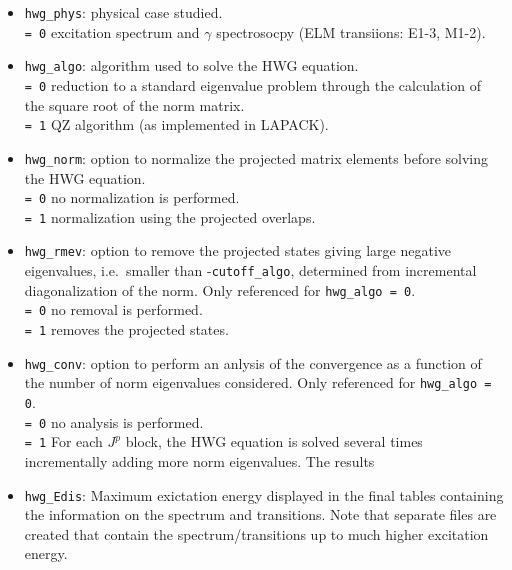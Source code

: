 \documentclass[a4paper,11pt]{article}
\newcommand{\ttt}[1]{\texttt{#1}}
\begin{document}
\begin{itemize}
\item \ttt{hwg\_phys}: physical case studied. \\[0.05cm]
 \ttt{= 0\:} excitation spectrum and $\gamma$ spectrosocpy (ELM transiions: E1-3, M1-2). 
\item \ttt{hwg\_algo}: algorithm used to solve the HWG equation. \\[0.05cm]
 \ttt{= 0\:} reduction to a standard eigenvalue problem through the calculation of the square root of the norm matrix. \\[0.05cm]
 \ttt{= 1\:} QZ algorithm (as implemented in LAPACK).
\item \ttt{hwg\_norm}: option to normalize the projected matrix elements before solving the HWG equation. \\[0.05cm]
 \ttt{= 0\:} no normalization is performed. \\[0.05cm]
 \ttt{= 1\:} normalization using the projected overlaps.
\item \ttt{hwg\_rmev}: option to remove the projected states giving large negative eigenvalues, i.e.\ smaller than -\ttt{cutoff\_algo}, determined from incremental
  diagonalization of the norm. Only referenced for \ttt{hwg\_algo = 0}. \\[0.05cm]
 \ttt{= 0\:} no removal is performed. \\[0.05cm]
 \ttt{= 1\:} removes the projected states.
\item \ttt{hwg\_conv}: option to perform an anlysis of the convergence as a function of the number of norm eigenvalues considered. Only referenced for \ttt{hwg\_algo = 0}. \\[0.05cm]
 \ttt{= 0\:} no analysis is performed. \\[0.05cm]
 \ttt{= 1\:} For each $J^p$ block, the HWG equation is solved several times incrementally adding more norm eigenvalues. The results
\item \ttt{hwg\_Edis}: Maximum exictation energy displayed in the final tables containing the information on the spectrum and transitions.
 Note that separate files are created that contain the spectrum/transitions up to much higher excitation energy. 
\end{itemize}
\end{document}
